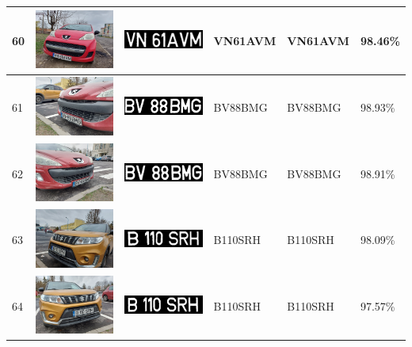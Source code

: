 \documentclass[a4paper,12pt]{report}
\begin{document}
\begin{longtable}{| m{0.6cm} | m{3cm} | m{3cm} | m{1.8cm} | m{1.8cm} | m{1.8cm} |}
        60 & \includegraphics[width=3cm,keepaspectratio]{dataset/34_d1.jpg} & \includegraphics[width=3cm,keepaspectratio]{segmentari/60.jpg} & VN61AVM & VN61AVM & 98.46\% \\ \hline
        61 & \includegraphics[width=3cm,keepaspectratio]{dataset/35_d1.jpg} & \includegraphics[width=3cm,keepaspectratio]{segmentari/61.jpg} & BV88BMG & BV88BMG & 98.93\% \\ \hline
        62 & \includegraphics[width=3cm,keepaspectratio]{dataset/35_s1.jpg} & \includegraphics[width=3cm,keepaspectratio]{segmentari/62.jpg} & BV88BMG & BV88BMG & 98.91\% \\ \hline
        63 & \includegraphics[width=3cm,keepaspectratio]{dataset/36_d1.jpg} & \includegraphics[width=3cm,keepaspectratio]{segmentari/63.jpg} & B110SRH & B110SRH & 98.09\% \\ \hline
        64 & \includegraphics[width=3cm,keepaspectratio]{dataset/36_s1.jpg} & \includegraphics[width=3cm,keepaspectratio]{segmentari/64.jpg} & B110SRH & B110SRH & 97.57\% \\ \hline

\end{longtable}
\end{document}
